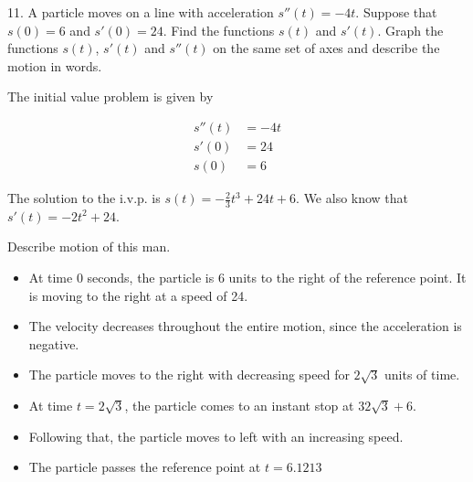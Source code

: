 \documentclass[12pt,twoside]{article}
\begin{document}
11. A particle moves on a line with acceleration $s''(t) = -4t$. Suppose that $s(0) = 6$ and $s'(0) = 24$. Find the functions $s(t)$ and $s'(t)$. Graph the functions $s(t)$, $s'(t)$ and $s''(t)$ on the same set of axes and describe the motion in words.

The initial value problem is given by 

\begin{align*}
s''(t) &= -4t \\
s'(0) &= 24 \\
s(0) & = 6
\end{align*}

The solution to the i.v.p. is $s(t) = -\frac{2}{3} t^3 + 24t + 6$. We also know that $s'(t) = -2t^2 + 24$. 

Describe motion of this man.
\begin{itemize}
\item At time 0 seconds, the particle is 6 units to the right of the reference point. It is moving to the right at a speed of 24. 
\item The velocity decreases throughout the entire motion, since the acceleration is negative.  
\item The particle moves to the right with decreasing speed for $2\sqrt{3}$ units of time.
\item At time $t = 2\sqrt{3}$, the particle comes to an instant stop at $32\sqrt{3} + 6$. 
\item Following that, the particle moves to left with an increasing speed. 
\item The particle passes the reference point at $t = 6.1213$
\end{itemize}
\end{document}

